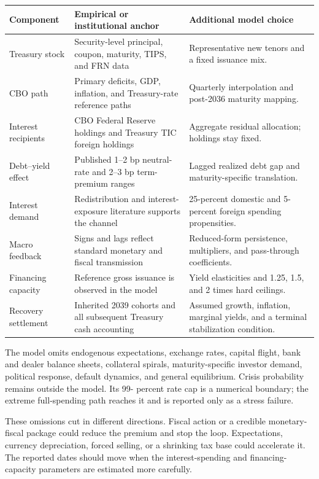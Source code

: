 \documentclass[11pt]{article}
\begin{document}
\begin{center}
\small
\setlength{\tabcolsep}{4pt}
\renewcommand{\arraystretch}{1.08}
\begin{tabularx}{\textwidth}{p{}YY}
\toprule
Component & Empirical or institutional anchor & Additional model choice \\
\midrule
Treasury stock & Security-level principal, coupon, maturity, TIPS, and FRN data &
Representative new tenors and a fixed issuance mix. \\
\addlinespace
CBO path & Primary deficits, GDP, inflation, and Treasury-rate reference paths &
Quarterly interpolation and post-2036 maturity mapping. \\
\addlinespace
Interest recipients & CBO Federal Reserve holdings and Treasury TIC foreign holdings &
Aggregate residual allocation; holdings stay fixed. \\
\addlinespace
Debt--yield effect & Published 1--2 bp neutral-rate and 2--3 bp term-premium ranges &
Lagged realized debt gap and maturity-specific translation. \\
\addlinespace
Interest demand & Redistribution and interest-exposure literature supports the channel &
25-percent domestic and 5-percent foreign spending propensities. \\
\addlinespace
Macro feedback & Signs and lags reflect standard monetary and fiscal transmission &
Reduced-form persistence, multipliers, and pass-through coefficients. \\
\addlinespace
Financing capacity & Reference gross issuance is observed in the model &
Yield elasticities and 1.25, 1.5, and 2 times hard ceilings. \\
\addlinespace
Recovery settlement & Inherited 2039 cohorts and all subsequent Treasury cash accounting &
Assumed growth, inflation, marginal yields, and a terminal stabilization condition. \\
\bottomrule
\end{tabularx}
\end{center}

The model omits endogenous expectations, exchange rates, capital flight, bank and dealer
balance sheets, collateral spirals, maturity-specific investor demand, political response,
default dynamics, and general equilibrium.  Crisis probability remains outside the model.  Its 99-
percent rate cap is a numerical boundary; the extreme full-spending path reaches it and is
reported only as a stress failure.

These omissions cut in different directions.  Fiscal action or a credible monetary-fiscal
package could reduce the premium and stop the loop.  Expectations, currency depreciation,
forced selling, or a shrinking tax base could accelerate it.  The reported dates should move
when the interest-spending and financing-capacity parameters are estimated more carefully.
\end{document}
